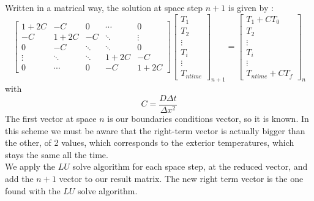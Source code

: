 \documentclass{article}
\begin{document}
                Written in a matrical way, the solution at space step $n+1$ is given by :
                \begin{equation}
                    \label{eq:laas}
                    \begin{bmatrix}
                        1+2C   & -C     & 0      & \cdots & 0 \\
                        -C     & 1+2C   & -C     & \ddots & \vdots \\
                        0      & -C     & \ddots & \ddots & 0 \\
                        \vdots & \ddots & \ddots & 1+2C   & -C\\
                        0      & \cdots & 0      & -C     & 1+2C
                    \end{bmatrix}
                    \begin{bmatrix}
                        T_{1} \\
                        T_{2} \\
                        \vdots \\
                        T_{i} \\
                        \vdots \\
                        T_{ntime}
                    \end{bmatrix}_{n+1}
                    =
                    \begin{bmatrix}
                        T_{1} + CT_{0}\\
                        T_{2} \\
                        \vdots \\
                        T_{i} \\
                        \vdots \\
                        T_{ntime} + CT_{f}
                    \end{bmatrix}_{n}
                \end{equation}
                with $$C = \frac{D\Delta t}{\Delta x ^2}  $$ 
                The first vector at space $n$ is our boundaries conditions vector, so it is known.
                In this scheme we must be aware that the right-term vector is actually bigger than
                the other, of 2 values, which corresponds to the exterior temperatures, which stays
                the same all the time.\\
                We apply the $LU$ solve algorithm for each space step, at the reduced vector, and add the $n+1$ vector to our 
                result matrix. The new right term vector is the one found with the $LU$ solve algorithm.
 
\end{document}
